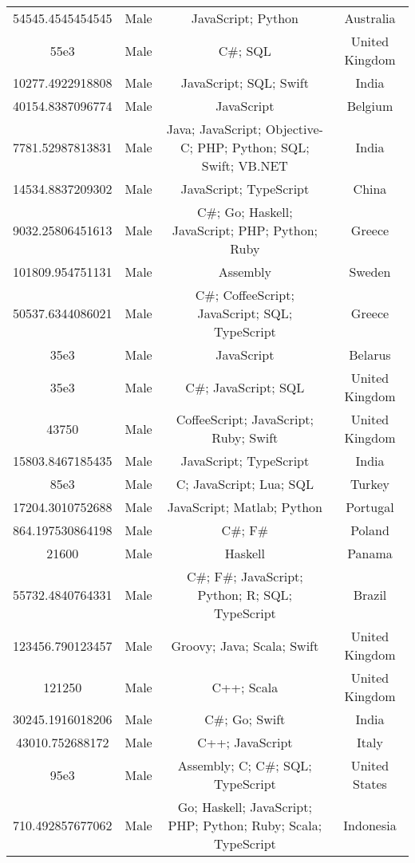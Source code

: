 \begin{center}
\begin{tabular}{ |c|c|c|c| }
54545.4545454545  &  Male  &  JavaScript; Python  &  Australia  \\ 
55e3  &  Male  &  C\#; SQL  &  United Kingdom  \\ 
10277.4922918808  &  Male  &  JavaScript; SQL; Swift  &  India  \\ 
40154.8387096774  &  Male  &  JavaScript  &  Belgium  \\ 
7781.52987813831  &  Male  &  Java; JavaScript; Objective-C; PHP; Python; SQL; Swift; VB.NET  &  India  \\ 
14534.8837209302  &  Male  &  JavaScript; TypeScript  &  China  \\ 
9032.25806451613  &  Male  &  C\#; Go; Haskell; JavaScript; PHP; Python; Ruby  &  Greece  \\ 
101809.954751131  &  Male  &  Assembly  &  Sweden  \\ 
50537.6344086021  &  Male  &  C\#; CoffeeScript; JavaScript; SQL; TypeScript  &  Greece  \\ 
35e3  &  Male  &  JavaScript  &  Belarus  \\ 
35e3  &  Male  &  C\#; JavaScript; SQL  &  United Kingdom  \\ 
43750  &  Male  &  CoffeeScript; JavaScript; Ruby; Swift  &  United Kingdom  \\ 
15803.8467185435  &  Male  &  JavaScript; TypeScript  &  India  \\ 
85e3  &  Male  &  C; JavaScript; Lua; SQL  &  Turkey  \\ 
17204.3010752688  &  Male  &  JavaScript; Matlab; Python  &  Portugal  \\ 
864.197530864198  &  Male  &  C\#; F\#  &  Poland  \\ 
21600  &  Male  &  Haskell  &  Panama  \\ 
55732.4840764331  &  Male  &  C\#; F\#; JavaScript; Python; R; SQL; TypeScript  &  Brazil  \\ 
123456.790123457  &  Male  &  Groovy; Java; Scala; Swift  &  United Kingdom  \\ 
121250  &  Male  &  C++; Scala  &  United Kingdom  \\ 
30245.1916018206  &  Male  &  C\#; Go; Swift  &  India  \\ 
43010.752688172  &  Male  &  C++; JavaScript  &  Italy  \\ 
95e3  &  Male  &  Assembly; C; C\#; SQL; TypeScript  &  United States  \\ 
710.492857677062  &  Male  &  Go; Haskell; JavaScript; PHP; Python; Ruby; Scala; TypeScript  &  Indonesia  \\ 

\end{tabular}
\end{center}

